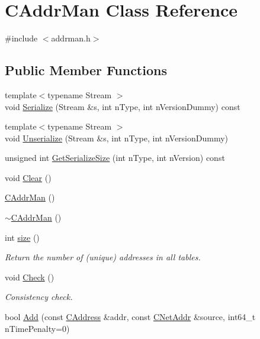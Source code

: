 \hypertarget{class_c_addr_man}{}\section{C\+Addr\+Man Class Reference}
\label{class_c_addr_man}


{\ttfamily \#include $<$addrman.\+h$>$}

\subsection*{Public Member Functions}
\begin{DoxyCompactItemize}
\item 
{\footnotesize template$<$typename Stream $>$ }\\void \hyperlink{class_c_addr_man_a88d4327f77fa70d9a88917897c3c6c97}{Serialize} (Stream \&s, int n\+Type, int n\+Version\+Dummy) const 
\item 
{\footnotesize template$<$typename Stream $>$ }\\void \hyperlink{class_c_addr_man_a68eaf1797ecb8bff380aa7f9fc452e14}{Unserialize} (Stream \&s, int n\+Type, int n\+Version\+Dummy)
\item 
unsigned int \hyperlink{class_c_addr_man_aa2266bea9d5336b0a93fe703a8601e55}{Get\+Serialize\+Size} (int n\+Type, int n\+Version) const 
\item 
void \hyperlink{class_c_addr_man_a53c27520b7f8c6fa817c2fa869dd4e25}{Clear} ()
\item 
\hyperlink{class_c_addr_man_ad9179d1c36c2ea3492e221576f340d33}{C\+Addr\+Man} ()
\item 
\hyperlink{class_c_addr_man_ae1b1838e4de4effbc1fbc888126a9352}{$\sim$\+C\+Addr\+Man} ()
\item 
int \hyperlink{class_c_addr_man_a15b8e72f55344b6fbd1bc1bda3cdc5bc}{size} ()
\begin{DoxyCompactList}\small\item\em Return the number of (unique) addresses in all tables. \end{DoxyCompactList}\item 
void \hyperlink{class_c_addr_man_a0c2677ae50ce0d680f0105b285d1f5d0}{Check} ()
\begin{DoxyCompactList}\small\item\em Consistency check. \end{DoxyCompactList}\item 
bool \hyperlink{class_c_addr_man_a03fcc7109b5f014760dc50a81f68c5ec}{Add} (const \hyperlink{class_c_address}{C\+Address} \&addr, const \hyperlink{class_c_net_addr}{C\+Net\+Addr} \&source, int64\+\_\+t n\+Time\+Penalty=0)

\end{DoxyCompactItemize}

